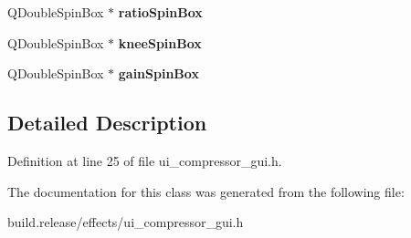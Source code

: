 \begin{DoxyCompactItemize}
\mbox{\label{class_ui___compressor_gui_a45a514c50f2f59048da5c6acc2a46d9d}} 
Q\+Double\+Spin\+Box $\ast$ {\bfseries ratio\+Spin\+Box}
\item 
\mbox{\label{class_ui___compressor_gui_a4b0bc5df029c9687e464adf3f556565c}} 
Q\+Double\+Spin\+Box $\ast$ {\bfseries knee\+Spin\+Box}
\item 
\mbox{\label{class_ui___compressor_gui_a7749a62f10edfe12e5e150c2534c86a6}} 
Q\+Double\+Spin\+Box $\ast$ {\bfseries gain\+Spin\+Box}
\end{DoxyCompactItemize}


\subsection{Detailed Description}


Definition at line 25 of file ui\+\_\+compressor\+\_\+gui.\+h.



The documentation for this class was generated from the following file\+:\begin{DoxyCompactItemize}
\item 
build.\+release/effects/ui\+\_\+compressor\+\_\+gui.\+h\end{DoxyCompactItemize}
